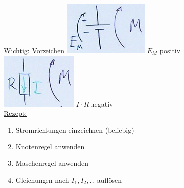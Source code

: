 \uline{Wichtig: Vorzeichen}
\includegraphics{Bild192} $E_M$ positiv \\
\includegraphics{Bild193} $I \cdot R$ negativ \\
\uline{Rezept:}
\begin{enumerate}[ label = \arabic*) ]
	\item Stromrichtungen einzeichnen (beliebig)
	\item Knotenregel anwenden
	\item Maschenregel anwenden
	\item Gleichungen nach $I_1 , I_2, \dots$ auflösen
\end{enumerate}
